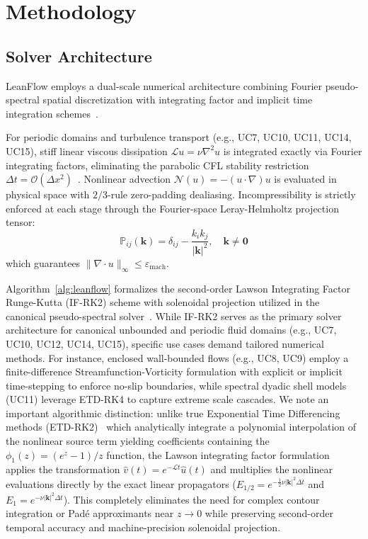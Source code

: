 
\section{Methodology}
\label{sec:methodology}

\subsection{Solver Architecture}

LeanFlow employs a dual-scale numerical architecture combining Fourier pseudo-spectral spatial discretization with integrating factor and implicit time integration schemes~\citep{canuto2006spectral}.

For periodic domains and turbulence transport (e.g., UC7, UC10, UC11, UC14, UC15), stiff linear viscous dissipation $\mathcal{L} u = \nu \nabla^2 u$ is integrated exactly via Fourier integrating factors, eliminating the parabolic CFL stability restriction $\Delta t = \mathcal{O}(\Delta x^2)$~\citep{lawson1967runge}. Nonlinear advection $\mathcal{N}(u) = -(u \cdot \nabla)u$ is evaluated in physical space with $2/3$-rule zero-padding dealiasing. Incompressibility is strictly enforced at each stage through the Fourier-space Leray-Helmholtz projection tensor:
\begin{equation}
  \mathbb{P}_{ij}(\mathbf{k}) = \delta_{ij} - \frac{k_i k_j}{|\mathbf{k}|^2}, \quad \mathbf{k} \neq \mathbf{0}
\end{equation}
which guarantees $\|\nabla \cdot u\|_\infty \le \varepsilon_{\text{mach}}$.

Algorithm~\ref{alg:leanflow} formalizes the second-order Lawson Integrating Factor Runge-Kutta (IF-RK2) scheme with solenoidal projection utilized in the canonical pseudo-spectral solver~\citep{lawson1967runge}. While IF-RK2 serves as the primary solver architecture for canonical unbounded and periodic fluid domains (e.g., UC7, UC10, UC12, UC14, UC15), specific use cases demand tailored numerical methods. For instance, enclosed wall-bounded flows (e.g., UC8, UC9) employ a finite-difference Streamfunction-Vorticity formulation with explicit or implicit time-stepping to enforce no-slip boundaries, while spectral dyadic shell models (UC11) leverage ETD-RK4 to capture extreme scale cascades. We note an important algorithmic distinction: unlike true Exponential Time Differencing methods (ETD-RK2)~\citep{cox2002exponential,kassam2005fourth} which analytically integrate a polynomial interpolation of the nonlinear source term yielding coefficients containing the $\phi_1(z) = (e^z - 1)/z$ function, the Lawson integrating factor formulation applies the transformation $\hat{v}(t) = e^{-\mathcal{L}t}\hat{u}(t)$ and multiplies the nonlinear evaluations directly by the exact linear propagators ($E_{1/2} = e^{-\frac{1}{2}\nu |\mathbf{k}|^2 \Delta t}$ and $E_1 = e^{-\nu |\mathbf{k}|^2 \Delta t}$). This completely eliminates the need for complex contour integration or Pad\'e approximants near $z \to 0$ while preserving second-order temporal accuracy and machine-precision solenoidal projection.

